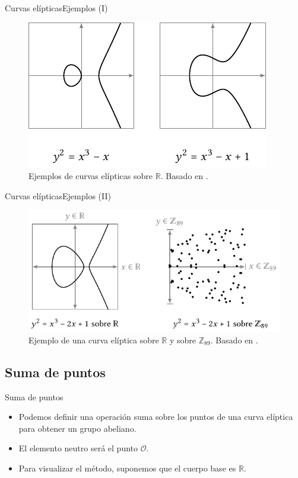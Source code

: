 \documentclass[spanish]{beamer}
\begin{document}
\begin{frame}[fragile]{Curvas elípticas}{Ejemplos (I)}
  \begin{figure}[h]
    \centering
    \includegraphics[width=.75\textwidth]{img/ejemplos-curvas}
    \caption{Ejemplos de curvas elípticas sobre $\mathbb{R}$. Basado en \parencite{eichlseder_elliptic_2016}.}
    \label{fig:curvas}
  \end{figure}
\end{frame}

\begin{frame}[fragile]{Curvas elípticas}{Ejemplos (II)}
  \begin{figure}[h]
    \centering
    \includegraphics[width=.85\textwidth]{img/cuerpos-curvas}
    \caption{Ejemplo de una curva elíptica sobre $\mathbb{R}$ y sobre $\mathbb{Z}_{89}$. Basado en \parencite{eichlseder_elliptic_2016}.}
    \label{fig:curvas-finitos}
  \end{figure}
\end{frame}

\subsection{Suma de puntos}
\begin{frame}{Suma de puntos}
  \begin{itemize}
    \item Podemos definir una operación suma sobre los puntos de una curva elíptica para obtener un grupo abeliano.
    \item El elemento neutro será el punto \(\mathcal{O}\).
    \item Para visualizar el método, suponemos que el cuerpo base es $\mathbb{R}$.
  \end{itemize}
\end{frame}
\end{document}
